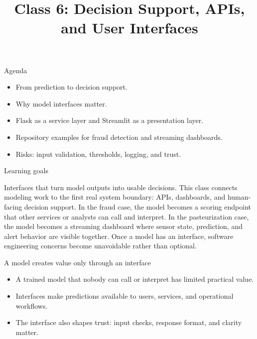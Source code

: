 

\title{Class 6: Decision Support, APIs, and User Interfaces}
\author{\coursename}
\date{}



\frame{\titlepage \coursefooter}

\begin{frame}{Agenda}
\begin{itemize}
\item From prediction to decision support.
\item Why model interfaces matter.
\item Flask as a service layer and Streamlit as a presentation layer.
\item Repository examples for fraud detection and streaming dashboards.
\item Risks: input validation, thresholds, logging, and trust.
\end{itemize}
\coursefooter
\end{frame}

\begin{frame}{Learning goals}
\coursefooter
\end{frame}

\coursecontextframe
{Interfaces that turn model outputs into usable decisions.}
{This class connects modeling work to the first real system boundary: APIs, dashboards, and human-facing decision support.}
{In the fraud case, the model becomes a scoring endpoint that other services or analysts can call and interpret.}
{In the pasteurization case, the model becomes a streaming dashboard where sensor state, prediction, and alert behavior are visible together.}
{Once a model has an interface, software engineering concerns become unavoidable rather than optional.}

\begin{frame}{A model creates value only through an interface}
\begin{itemize}
\item A trained model that nobody can call or interpret has limited practical value.
\item Interfaces make predictions available to users, services, and operational workflows.
\item The interface also shapes trust: input checks, response format, and clarity matter.
\end{itemize}
\coursefooter
\end{frame}

